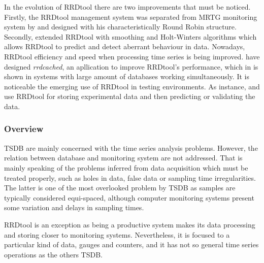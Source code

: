 In the evolution of RRDtool there are two improvements that must be noticed.
Firstly, the RRDtool management system was separated from MRTG monitoring system by \textcite{lisa98:oetiker} and designed with his characteristically Round Robin structure. Secondly, \textcite{lisa00:brutlag} extended RRDtool with smoothing and Holt-Winters algorithms which allows RRDtool to predict and detect aberrant behaviour in data.  
Nowadays, RRDtool efficiency and speed when processing time series is being improved. \textcite{carder:rrdcached} have designed \emph{rrdcached}, an apllication to improve RRDtool's performance, which in \cite{lisa07:plonka} is shown  in systems with large amount of databases working simultaneously.
It is noticeable the emerging use of RRDtool in testing environments. As instance, \textcite{zhang07} and \textcite{chilingaryan10} use RRDtool for storing experimental data and then predicting or validating the data.


\subsubsection{Overview}

TSDB are mainly concerned with the time series analysis problems. However, the relation between database and monitoring system are not addressed. That is mainly speaking of the problems inferred from data acquisition which  must be treated properly, such as holes in data, false data or sampling time irregularities. 
The latter is one of the most overlooked problem by TSDB as samples are typically considered equi-spaced, although computer monitoring systems present some variation and delays in sampling times. 

RRDtool is an exception as being a productive system makes its data processing and storing closer to monitoring systems. Nevertheless, it is focused to a particular kind of data, gauges and counters, and it has not so general time series operations as the others TSDB.










